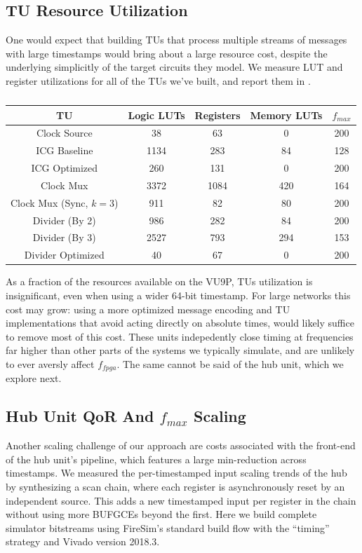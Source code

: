 
\subsection{TU Resource Utilization}
One would expect that building TUs that process multiple streams of messages
with large timestamps would bring about a large resource cost, despite the
underlying simplicitly of the target circuits they model. We measure LUT and
register utilizations for all of the TUs we've built, and report them in .

\begin{table}[t]
\centering
    \begin{tabular}{c c c c c}
        TU & Logic LUTs & Registers & Memory LUTs & $f_{max}$ \\
    \hline
        Clock Source & 38 & 63 & 0& 200 \\
        \hline
        ICG Baseline  & 1134 & 283 & 84& 128 \\
        ICG Optimized & 260 & 131 & 0& 200 \\
        \hline
        Clock Mux & 3372 & 1084 & 420& 164 \\
        Clock Mux (Sync, $k=3$) & 911 & 82 & 80& 200 \\
        \hline
        Divider (By 2) & 986 & 282 & 84& 200 \\
        Divider (By 3) & 2527 & 793 & 294& 153 \\
        Divider Optimized & 40 & 67 & 0& 200 \\
    \hline
    \end{tabular}
    \caption{}
    \label{tbl:pdes-tu-utilization}
\end{table}

As a fraction of the resources available on the VU9P, TUs utilization is
insignificant, even when using a wider 64-bit timestamp.  For large networks
this cost may grow: using a more optimized message  encoding and TU
implementations that avoid acting directly on absolute times, would likely
suffice to remove most of this cost. These units indepedently close timing at
frequencies far higher than other parts of the systems we typically simulate,
and are unlikely to ever aversly affect $f_{fpga}$. The same cannot be said of
the hub unit, which we explore next.

\subsection{Hub Unit QoR And $f_{max}$ Scaling}
Another scaling challenge of our approach are costs associated with the
front-end of the hub unit's pipeline, which features a large min-reduction
across timestamps. We measured the per-timestamped input scaling trends of the
hub by synthesizing a scan chain, where each register is asynchronously reset
by an independent source. This adds a new timestamped input per register in the
chain without using more BUFGCEs beyond the first. Here we build complete simulator bitstreams using FireSim's standard
build flow with the ``timing'' strategy and Vivado version 2018.3.

